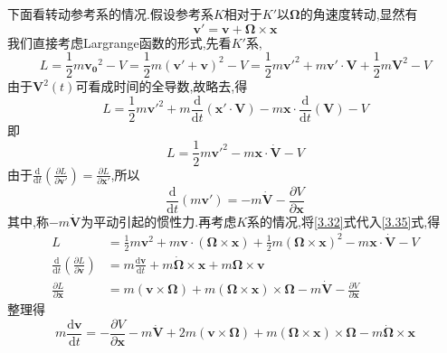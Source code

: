 下面看转动参考系的情况.假设参考系$K$相对于$K'$以$\boldsymbol{\Omega}$的角速度转动,显然有
\begin{equation}
\boldsymbol{v}' = \boldsymbol{v} + \boldsymbol{\Omega}\times\boldsymbol{x}
\label{3.32}
\end{equation}
我们直接考虑Largrange函数的形式,先看$K'$系,
\begin{equation}
L = \frac{1}{2}m\boldsymbol{v_0}^2 - V = \frac{1}{2}m(\boldsymbol{v'}+\boldsymbol{v})^2 - V
= \frac{1}{2}m\boldsymbol{v'}^2 + m\boldsymbol{v'}\cdot\boldsymbol{V} + \frac{1}{2}m\boldsymbol{V}^2 - V
\end{equation}
由于$\boldsymbol{V}^2(t)$可看成时间的全导数,故略去,得
\begin{equation}
L = \frac{1}{2}m\boldsymbol{v'}^2 + m\frac{\mathrm{d}}{\mathrm{d}t}(\boldsymbol{x'}\cdot\boldsymbol{V}) - m\boldsymbol{x}\cdot \frac{\mathrm{d}}{\mathrm{d}t}(\boldsymbol{V}) - V
\end{equation}
即
\begin{equation}
L = \frac{1}{2}m\boldsymbol{v'}^2 - m\boldsymbol{x}\cdot\boldsymbol{\dot{V}} - V
\label{3.35}
\end{equation}
由于$\frac{\mathrm{d}}{\mathrm{d}t}\left( \frac{\partial L}{\partial\boldsymbol{v'}} \right) = 
\frac{\partial L}{\partial \boldsymbol{x'}}$,所以
\begin{equation}
\frac{\mathrm{d}}{\mathrm{d}t}(m\boldsymbol{v'}) = -m\boldsymbol{\dot{V}} - 
\frac{\partial V}{\partial\boldsymbol{x}}
\end{equation}
其中,称$-m\boldsymbol{\dot{V}}$为平动引起的惯性力.再考虑$K$系的情况,将\eqref{3.32}式代入\eqref{3.35}式,得
\begin{align}
L & = \frac{1}{2}m\boldsymbol{v}^2 + m\boldsymbol{v}\cdot(\boldsymbol{\Omega}\times\boldsymbol{x}) + \frac{1}{2}m(\boldsymbol{\Omega}\times\boldsymbol{x})^2 - m\boldsymbol{x}\cdot\boldsymbol{\dot{V}} - V \\
\frac{\mathrm{d}}{\mathrm{d}t}\left( \frac{\partial L}{\partial\boldsymbol{v}} \right) & = 
m\frac{\mathrm{d}\boldsymbol{v}}{\mathrm{d}t} + m\boldsymbol{\dot{\Omega}}\times\boldsymbol{x} + m\boldsymbol{\Omega}\times\boldsymbol{v} \\
\frac{\partial L}{\partial\boldsymbol{x}} & = m(\boldsymbol{v}\times\boldsymbol{\Omega}) + m(\boldsymbol{\Omega}\times\boldsymbol{x})\times\boldsymbol{\Omega} - m\boldsymbol{\dot{V}} - \frac{\partial V}{\partial\boldsymbol{x}}
\end{align}
整理得
\begin{equation}
m\frac{\mathrm{d}\boldsymbol{v}}{\mathrm{d}t} = -\frac{\partial V}{\partial\boldsymbol{x}} -m\boldsymbol{\dot{V}} + 
2m(\boldsymbol{v}\times\boldsymbol{\Omega}) + m(\boldsymbol{\Omega}\times\boldsymbol{x})\times\boldsymbol{\Omega} - m\boldsymbol{\dot{\Omega}}\times\boldsymbol{x}
\end{equation}
